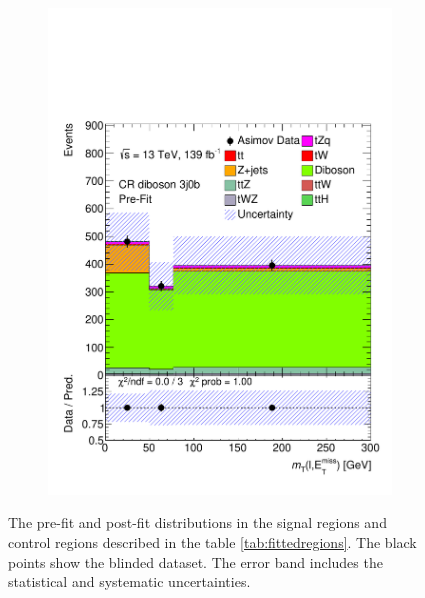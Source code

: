 \begin{figure}[!h]
\begin{subfigure}[b]{0.33\linewidth}
    \includegraphics[width=\textwidth]{ubonn-thesis/Chapters/Chapters_07/Figure/Asmiov/CR_3j0b.pdf} 
  \end{subfigure} 
  \caption{ The pre-fit and post-fit distributions in the signal regions and control regions described in the table \ref{tab:fittedregions}. The black points show the blinded dataset. The error band includes the statistical and systematic uncertainties.}
  \label{fig:asimovfit1}
\end{figure}

